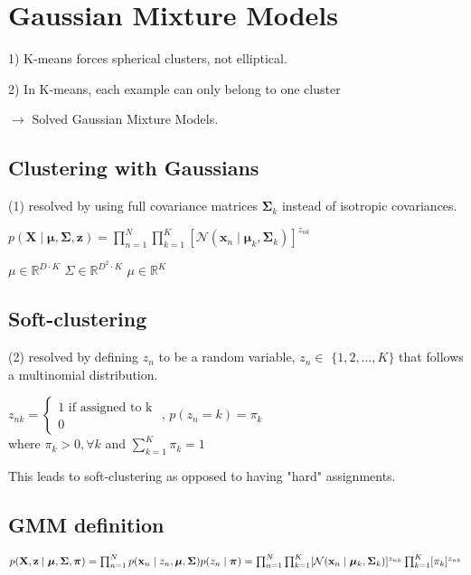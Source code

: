 
\section*{Gaussian Mixture Models}
1) K-means forces spherical clusters, not elliptical.

2) In K-means, each example can only belong to one cluster

$\rightarrow$ Solved Gaussian Mixture Models.

\subsection*{Clustering with Gaussians}
(1) resolved by using full covariance matrices $\boldsymbol{\Sigma}_{k}$ instead of isotropic covariances.

$p(\mathbf{X} \mid \boldsymbol{\mu}, \boldsymbol{\Sigma}, \mathbf{z})=\prod_{n=1}^{N} \prod_{k=1}^{K}\left[\mathcal{N}\left(\mathbf{x}_{n} \mid \boldsymbol{\mu}_{k}, \boldsymbol{\Sigma}_{k}\right)\right]^{z_{n k}}$

$\mu \in \mathbb{R}^{D\cdot K}$
$\Sigma \in \mathbb{R}^{D^2\cdot K}$
$\mu \in \mathbb{R}^{K}$

\subsection*{Soft-clustering}
(2) resolved by defining $z_{n}$ to be a random variable, $z_{n} \in$ $\{1,2, \ldots, K\}$ that follows a multinomial distribution.

$z_{nk}=\begin{cases}1\text{ if assigned to k}\\0\end{cases}$ , 
$p\left(z_{n}=k\right)=\pi_{k}$ \\where $\pi_{k}>0, \forall k$ and $\sum_{k=1}^{K} \pi_{k}=1$

This leads to soft-clustering as opposed to having "hard" assignments.


\subsection*{GMM definition}

$
p(\mathbf{X}, \mathbf{z} \mid \boldsymbol{\mu}, \boldsymbol{\Sigma}, \boldsymbol{\pi}) 
= \prod_{n=1}^{N} p(\mathbf{x}_{n} \mid z_{n}, \boldsymbol{\mu}, \boldsymbol{\Sigma}) p(z_{n} \mid \boldsymbol{\pi}) 
\\= \prod_{n=1}^{N} \prod_{k=1}^{K}[\mathcal{N}(\mathbf{x}_{n} \mid \boldsymbol{\mu}_{k}, \boldsymbol{\Sigma}_{k})]^{z_{n k}} \prod_{k=1}^{K}[\pi_{k}]^{z_{n k}}
$


